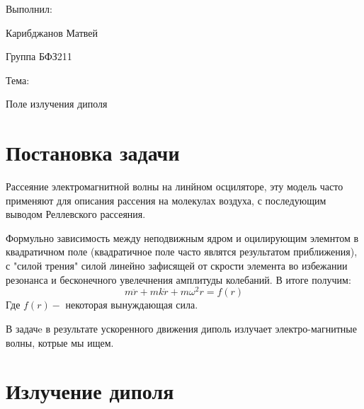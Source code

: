 \documentclass[a4paper]{article}
\numberwithin{equation}{section}
\begin{document}
\begin{flushright}
    Выполнил:

    Карибджанов Матвей
    
    Группа БФЗ211

    Тема:

    Поле излучения диполя
\end{flushright}
\tableofcontents
{}
\pagestyle{main}
\pagecolor{mycolor}



\section{Постановка задачи}
Рассеяние электромагнитной волны на линйном осциляторе, эту модель 
часто применяют для описания рассения на молекулах воздуха, с последующим 
выводом Реллевского рассеяния. 

Формульно зависимость между неподвижным ядром и оцилирующим элемнтом 
в квадратичном поле (квадратичное поле часто являтся результатом приближения), 
с "силой трения" силой линейно зафисящей от скрости элемента во избежании 
резонанса и бесконечного увелечнения амплитуды колебаний. В итоге получим:
\begin{equation}
    m\ddot r + mk \dot r + m\omega^2 r = f(r)
\end{equation}
Где $f(r)-$ некоторая вынуждающая сила.

В задачe в результате ускоренного движения диполь излучает 
электро-магнитные волны, котрые мы ищем.


\section{Излучение диполя}
\end{document}
